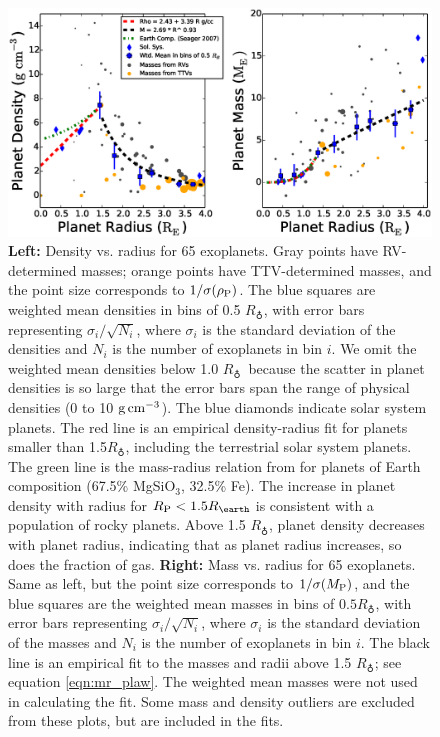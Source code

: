\documentclass[iop]{emulateapj}
\newcommand{\gcmc}{\ensuremath{\rm g\,cm^{-3}}}
\newcommand{\gcc}{\gcmc}
\newcommand{\rpl}{\ensuremath{R_{\rm P}}}
\newcommand{\mpl}{\ensuremath{M_{\rm P}}}
\newcommand{\rhopl}{\ensuremath{\rho_{\rm P}}}
\newcommand{\rearth}{\ensuremath{R_\earth}}
\begin{document}
\begin{figure}[htbp] %
   \centering
    \includegraphics[width=7in]{mr_small.eps} 
   \caption{\small \textbf{Left:} Density vs. radius for 65 exoplanets.  Gray points  have RV-determined masses; orange points have TTV-determined masses, and the point size corresponds to $1/\sigma(\rhopl)$.  The blue squares are weighted mean densities in bins of 0.5 \rearth, with error bars representing $\sigma_i/\sqrt{N_i}$, where $\sigma_i$ is the standard deviation of the densities and $N_i$ is the number of exoplanets in bin $i$.  We omit the weighted mean densities below 1.0 \rearth\ because the scatter in planet densities is so large that the error bars span the range of physical densities (0 to 10 \gcc).  The blue diamonds indicate solar system planets.  The red line is an empirical density-radius fit for planets smaller than 1.5\rearth, including the terrestrial solar system planets.  The green line is the mass-radius relation from \citet{Seager2007} for planets of Earth composition (67.5\% MgSiO$_3$, 32.5\% Fe).  The increase in planet density with radius for $\rpl < 1.5 \rearth$ is consistent with a population of rocky planets.  Above 1.5 \rearth, planet density decreases with planet radius, indicating that as planet radius increases, so does the fraction of gas.  \textbf{Right:} Mass vs. radius for 65 exoplanets.  Same as left, but the point size corresponds to $1/\sigma(\mpl)$, and the blue squares are the weighted mean masses in bins of $0.5 \rearth$, with error bars representing $\sigma_i/\sqrt{N_i}$, where $\sigma_i$ is the standard deviation of the masses and $N_i$ is the number of exoplanets in bin $i$. The black line is an empirical fit to the masses and radii above 1.5 \rearth; see equation \ref{eqn:mr_plaw}.  The weighted mean masses were not used in calculating the fit.   Some mass and density outliers are excluded from these plots, but are included in the fits. }
   \label{fig:rm_4}
\end{figure}
\end{document}
